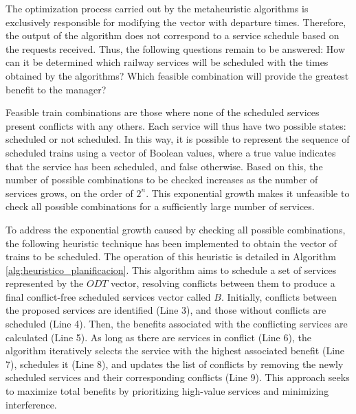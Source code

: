 \documentclass[Afour,sagev,times]{sagej}
\begin{document}
The optimization process carried out by the metaheuristic algorithms is exclusively responsible for modifying the vector with departure times. Therefore, the output of the algorithm does not correspond to a service schedule based on the requests received. Thus, the following questions remain to be answered: How can it be determined which railway services will be scheduled with the times obtained by the algorithms? Which feasible combination will provide the greatest benefit to the manager?

Feasible train combinations are those where none of the scheduled services present conflicts with any others. Each service will thus have two possible states: scheduled or not scheduled. In this way, it is possible to represent the sequence of scheduled trains using a vector of Boolean values, where a true value indicates that the service has been scheduled, and false otherwise. Based on this, the number of possible combinations to be checked increases as the number of services grows, on the order of $2^n$. This exponential growth makes it unfeasible to check all possible combinations for a sufficiently large number of services.

To address the exponential growth caused by checking all possible combinations, the following heuristic technique has been implemented to obtain the vector of trains to be scheduled. The operation of this heuristic is detailed in Algorithm \ref{alg:heuristico_planificacion}. This algorithm aims to schedule a set of services represented by the $ODT$ vector, resolving conflicts between them to produce a final conflict-free scheduled services vector called $B$. Initially, conflicts between the proposed services are identified (Line 3), and those without conflicts are scheduled (Line 4). Then, the benefits associated with the conflicting services are calculated (Line 5). As long as there are services in conflict (Line 6), the algorithm iteratively selects the service with the highest associated benefit (Line 7), schedules it (Line 8), and updates the list of conflicts by removing the newly scheduled services and their corresponding conflicts (Line 9). This approach seeks to maximize total benefits by prioritizing high-value services and minimizing interference.

\end{document}
